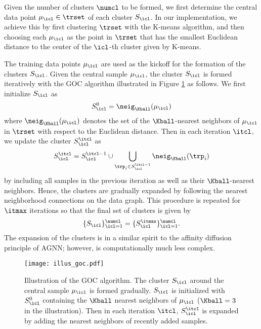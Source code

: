 \documentclass[journal]{IEEEtran}
\begin{document}
Given the number of clusters $\numcl$ to be formed, we first determine the central data point $\mu_\icl \in \trset$ of each cluster $S_\icl$. In our implementation, we achieve this by first clustering $\trset$ with the K-means algorithm, and then choosing each $\mu_\icl$ as the point in $\trset$ that has the smallest Euclidean distance to the center of the $\icl$-th cluster given by K-means. 



The training data points $ \mu_\icl$ are used as the kickoff for the formation of the clusters $S_\icl$. Given the central sample $\mu_\icl$, the cluster $S_\icl$ is formed iteratively with the GOC algorithm illustrated in Figure \ref{fig:illus_goc} as follows. We first initialize $S_\icl$ as
\begin{equation}
\label{eq:clus_init_goc}
S_\icl^0 = \neig_\Kball (\mu_\icl)
\end{equation}
where $\neig_\Kball (\mu_\icl)$ denotes the set of the $\Kball$-nearest neighbors of $\mu_\icl$ in $\trset$ with respect to the Euclidean distance. Then in each iteration $\itcl$, we update the cluster $S_\icl^\itcl$ as
\begin{equation}
S_\icl^\itcl =S_\icl^{\itcl-1} \cup  \bigcup_{\trp_i \in S_\icl^{\itcl-1} } \neig_\Kball (\trp_i)  
\end{equation}
by including all samples in the previous iteration as well as their $\Kball$-nearest neighbors. Hence, the clusters are gradually expanded by following the nearest neighborhood connections on the data graph. This procedure is repeated for $\itmax$ iterations so that the final set of clusters is given by
\begin{equation}
\label{eq:defn_clust_final}
\{ S_\icl \}_{\icl=1}^\numcl = \{ S_\icl^\itmax \}_{\icl=1}^\numcl .
\end{equation}
The expansion of the clusters is in a similar spirit to the affinity diffusion principle of AGNN; however, is computationally much less complex. 
 







\begin{figure}[!t]
	\centering
	\texttt{[image: illus\_goc.pdf]}
	\caption{Illustration of the GOC algorithm. The cluster $S_\icl$  around the central sample $\mu_\icl$ is formed gradually. $S_\icl$ is initialized with $S_\icl^0$ containing the $\Kball$ nearest neighbors of $\mu_\icl$ ($\Kball=3$ in the illustration). Then in each iteration $\itcl$, $S_\icl^{\itcl}$ is expanded by adding the nearest neighbors of recently added samples.}
	\label{fig:illus_goc}
\end{figure}
\end{document}
